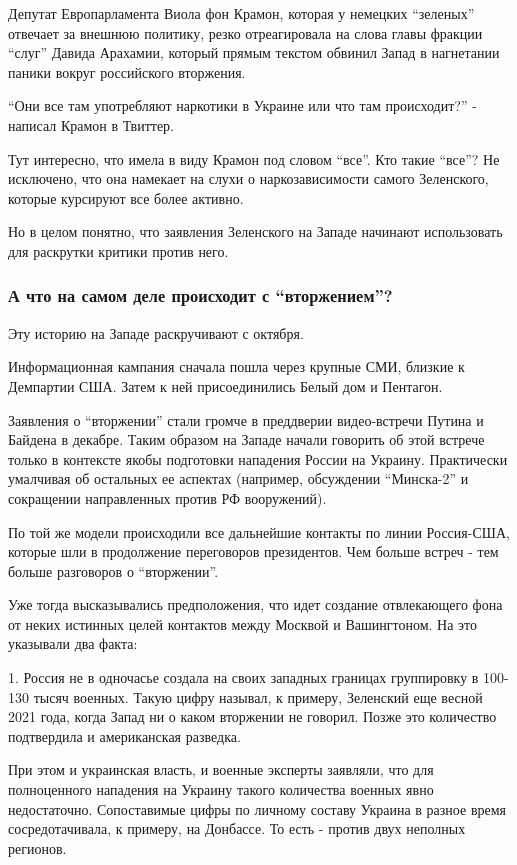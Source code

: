 Депутат Европарламента Виола фон Крамон, которая у немецких \enquote{зеленых} отвечает
за внешнюю политику, резко отреагировала на слова главы фракции \enquote{слуг} Давида
Арахамии, который прямым текстом обвинил Запад в нагнетании паники вокруг
российского вторжения.

\enquote{Они все там употребляют наркотики в Украине или что там происходит?} - написал
Крамон в Твиттер.

Тут интересно, что имела в виду Крамон под словом \enquote{все}. Кто такие \enquote{все}? Не
исключено, что она намекает на слухи о наркозависимости самого Зеленского,
которые курсируют все более активно.

Но в целом понятно, что заявления Зеленского на Западе начинают использовать
для раскрутки критики против него.

\subsubsection{А что на самом деле происходит с \enquote{вторжением}?}

Эту историю на Западе раскручивают с октября.

Информационная кампания сначала пошла через крупные СМИ, близкие к Демпартии
США. Затем к ней присоединились Белый дом и Пентагон. 

Заявления о \enquote{вторжении} стали громче в преддверии видео-встречи Путина и
Байдена в декабре. Таким образом на Западе начали говорить об этой встрече
только в контексте якобы подготовки нападения России на Украину. Практически
умалчивая об остальных ее аспектах (например, обсуждении \enquote{Минска-2} и
сокращении направленных против РФ вооружений).

По той же модели происходили все дальнейшие контакты по линии Россия-США,
которые шли в продолжение переговоров президентов. Чем больше встреч - тем
больше разговоров о \enquote{вторжении}.

Уже тогда высказывались предположения, что идет создание отвлекающего фона от
неких истинных целей контактов между Москвой и Вашингтоном. На это указывали
два факта:

1. Россия не в одночасье создала на своих западных границах группировку в
100-130 тысяч военных. Такую цифру называл, к примеру, Зеленский еще весной
2021 года, когда Запад ни о каком вторжении не говорил. Позже это количество
подтвердила и американская разведка. 

При этом и украинская власть, и военные эксперты заявляли, что для полноценного
нападения на Украину такого количества военных явно недостаточно. Сопоставимые
цифры по личному составу Украина в разное время сосредотачивала, к примеру, на
Донбассе. То есть - против двух неполных регионов.

